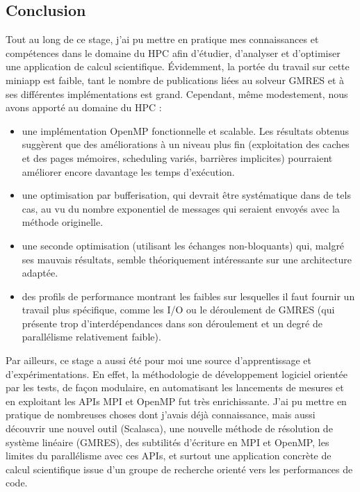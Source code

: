 \documentclass[11pt,a4paper,oneside]{memoir}
\theoremstyle{definition}
\theoremstyle{remark}
\theoremstyle{plain}
\begin{document}
\begin{vplace}[0.5]

\chapter*{Conclusion}


Tout au long de ce stage, j'ai pu mettre en pratique mes connaissances et compétences dans le domaine du HPC afin d'étudier, d'analyser et d'optimiser une application de calcul scientifique. \'Evidemment, la portée du travail sur cette miniapp est faible, tant le nombre de publications liées au solveur GMRES et à ses différentes implémentations est grand. Cependant, même modestement, nous avons apporté au domaine du HPC :
\begin{itemize}
\item une implémentation OpenMP fonctionnelle et scalable. Les résultats obtenus suggèrent que des améliorations à un niveau plus fin (exploitation des caches et des pages mémoires, scheduling variés, barrières implicites) pourraient améliorer encore davantage les temps d'exécution.
\item une optimisation par bufferisation, qui devrait être systématique dans de tels cas, au vu du nombre exponentiel de messages qui seraient envoyés avec la méthode originelle.
\item une seconde optimisation (utilisant les échanges non-bloquants) qui, malgré ses mauvais résultats, semble théoriquement intéressante sur une architecture adaptée.
\item des profils de performance montrant les faibles sur lesquelles il faut fournir un travail plus spécifique, comme les I/O ou le déroulement de GMRES (qui présente trop d'interdépendances dans son déroulement et un degré de parallélisme relativement faible).
\end{itemize}\bigskip

Par ailleurs, ce stage a aussi été pour moi une source d'apprentissage et d'expérimentations. En effet, la méthodologie de développement logiciel orientée par les tests, de façon modulaire, en automatisant les lancements de mesures et en exploitant les APIs MPI et OpenMP fut très enrichissante. J'ai pu mettre en pratique de nombreuses choses dont j'avais déjà connaissance, mais aussi découvrir une nouvel outil (Scalasca), une nouvelle méthode de résolution de système linéaire (GMRES), des subtilités d'écriture en MPI et OpenMP, les limites du parallélisme avec ces APIs, et surtout une application concrète de calcul scientifique issue d'un groupe de recherche orienté vers les performances de code.

\end{vplace}





\nocite{*}


\end{document}
